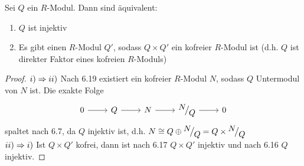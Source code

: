 \begin{fo}
	Sei $Q$ ein $R$-Modul. Dann sind äquivalent:
	\begin{enumerate}[label= \roman*)]
		\item $Q$ ist injektiv
		\item Es gibt einen $R$-Modul $Q'$, sodass $Q \times Q'$ ein kofreier $R$-Modul ist (d.h. $Q$ ist direkter Faktor eines kofreien $R$-Moduls)
	\end{enumerate}
\end{fo}
\begin{proof}
	$i) \Rightarrow ii)$ Nach 6.19 existiert ein kofreier $R$-Modul $N$, sodass $Q$ Untermodul von $N$ ist. Die exakte Folge 
	$$\begin{tikzcd}
	0 \arrow{r} & Q \arrow{r} & N \arrow{r} & \QR{N}{Q} \arrow{r} & 0
	\end{tikzcd}$$
	spaltet nach 6.7, da $Q$ injektiv ist, d.h. $N \cong Q \oplus \QR{N}{Q}  = Q \times \QR{N}{Q}$\\
	$ii) \Rightarrow i)$ Ist $Q\times Q'$ kofrei, dann ist nach 6.17 $Q \times Q'$ injektiv und nach 6.16 $Q$ injektiv.
\end{proof}
\newpage
